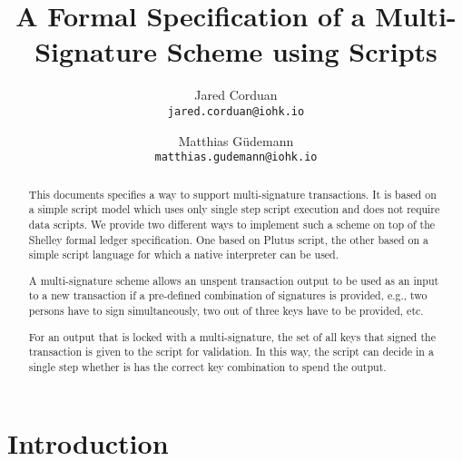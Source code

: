 \documentclass[11pt,a4paper,dvipsnames]{article}
\theoremstyle{definition}
\begin{document}

\title{A Formal Specification of a Multi-Signature Scheme using Scripts}

\author{Jared Corduan  \\ {\small \texttt{jared.corduan@iohk.io}} \\
   \and Matthias G\"udemann  \\ {\small \texttt{matthias.gudemann@iohk.io}}}


\maketitle

\begin{abstract}
  This documents specifies a way to support multi-signature transactions. It is
  based on a simple script model which uses only single step script execution
  and does not require data scripts. We provide two different ways to implement
  such a scheme on top of the Shelley formal ledger specification. One based on
  Plutus script, the other based on a simple script language for which a native
  interpreter can be used.

  A multi-signature scheme allows an unspent transaction output to be used as an
  input to a new transaction if a pre-defined combination of signatures is
  provided, e.g., two persons have to sign simultaneously, two out of three
  keys have to be provided, etc.

  For an output that is locked with a multi-signature, the set of all keys that
  signed the transaction is given to the script for validation. In this way, the
  script can decide in a single step whether is has the correct key combination
  to spend the output.
\end{abstract}



\section{Introduction}
\label{sec:introduction}
\end{document}
